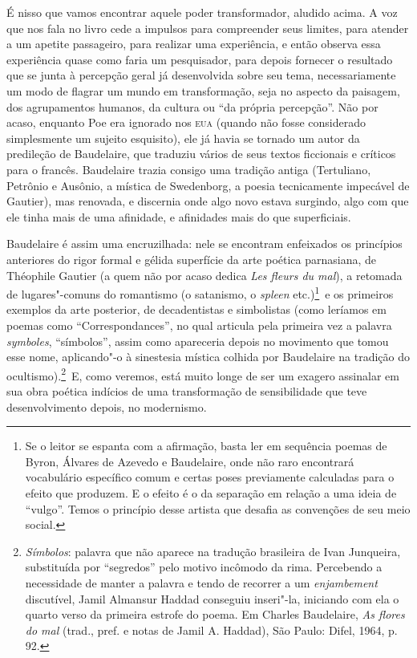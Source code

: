 É nisso que vamos encontrar aquele poder transformador, aludido acima. A
voz que nos fala no livro cede a impulsos para compreender seus
limites, para atender a um apetite passageiro, para realizar uma
experiência, e então observa essa experiência quase como faria um
pesquisador, para depois fornecer o resultado que se junta à percepção
geral já desenvolvida sobre seu tema, necessariamente um modo de
flagrar um mundo em transformação, seja no aspecto da paisagem, dos
agrupamentos humanos, da cultura ou “da própria percepção”. Não          
por acaso, enquanto Poe era ignorado nos \textsc{eua} (quando não fosse 
considerado simplesmente um sujeito esquisito), ele já havia se tornado
um autor da predileção de Baudelaire, que traduziu vários de seus
textos ficcionais e críticos para o francês. Baudelaire trazia consigo
uma tradição antiga (Tertuliano, Petrônio e Ausônio, a mística de
Swedenborg, a poesia tecnicamente impecável de Gautier), mas renovada,
e discernia onde algo novo estava surgindo, algo com que ele tinha mais
de uma afinidade, e afinidades mais do que superficiais.

Baudelaire é assim uma encruzilhada: nele se encontram enfeixados os
princípios anteriores do rigor formal e gélida superfície da arte
poética parnasiana, de Théophile Gautier (a quem não por acaso dedica
 \textit{Les fleurs du mal}), a retomada de lugares"-comuns do
romantismo (o satanismo, o \textit{spleen} etc.)\footnote{ Se o leitor
se espanta com a afirmação, basta ler em sequência poemas de Byron,
Álvares de Azevedo e Baudelaire, onde não raro encontrará vocabulário
específico comum e certas poses previamente calculadas para o efeito
que produzem. E o efeito é o da separação em relação a uma ideia de
“vulgo”. Temos o princípio desse artista que desafia as convenções de
seu meio social.}~e os primeiros exemplos da arte posterior, de
decadentistas e simbolistas (como leríamos em poemas como
“Correspondances”, no qual articula pela primeira vez a palavra
\textit{symboles}, “símbolos”, assim como apareceria depois no
movimento que tomou esse nome, aplicando"-o à sinestesia mística
colhida por Baudelaire na tradição do ocultismo).\footnote{ \textit{Símbolos}: 
palavra que não aparece na tradução brasileira de Ivan Junqueira,
substituída por “segredos” pelo motivo incômodo da rima. Percebendo a
necessidade de manter a palavra e tendo de recorrer a um \textit{enjambement}
discutível, Jamil Almansur Haddad conseguiu inseri"-la, iniciando com
ela o quarto verso da primeira estrofe do poema. Em Charles Baudelaire,
 \textit{As flores do mal} (trad., pref. e notas de Jamil A.
Haddad), São Paulo: Difel, 1964, p. 92.}~E, como veremos, está muito
longe de ser um exagero assinalar em sua obra poética indícios de uma
transformação de sensibilidade que teve desenvolvimento depois, no
modernismo.

